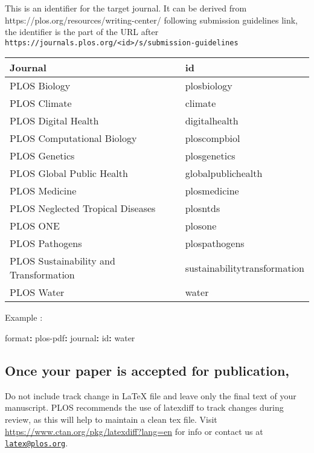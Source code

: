 \documentclass[
  10pt,
  letterpaper,
]{article}
\newenvironment{Shaded}{\begin{snugshade}}{\end{snugshade}}
\newcommand{\AttributeTok}[1]{\textcolor[rgb]{0.40,0.45,0.13}{#1}}
\newcommand{\FunctionTok}[1]{\textcolor[rgb]{0.28,0.35,0.67}{#1}}
\newcommand{\KeywordTok}[1]{\textcolor[rgb]{0.00,0.23,0.31}{\textbf{#1}}}
\begin{document}
This is an identifier for the target journal. It can be derived from
https://plos.org/resources/writing-center/ following submission
guidelines link, the identifier is the part of the URL after
\texttt{https://journals.plos.org/\textless{}id\textgreater{}/s/submission-guidelines}

\begin{longtable}[]{@{}ll@{}}
\toprule\noalign{}
Journal & id \\
\midrule\noalign{}
\endhead
\bottomrule\noalign{}
\endlastfoot
PLOS Biology & plosbiology \\
PLOS Climate & climate \\
PLOS Digital Health & digitalhealth \\
PLOS Computational Biology & ploscompbiol \\
PLOS Genetics & plosgenetics \\
PLOS Global Public Health & globalpublichealth \\
PLOS Medicine & plosmedicine \\
PLOS Neglected Tropical Diseases & plosntds \\
PLOS ONE & plosone \\
PLOS Pathogens & plospathogens \\
PLOS Sustainability and Transformation & sustainabilitytransformation \\
PLOS Water & water \\
\end{longtable}

Example :

\begin{Shaded}
\begin{Highlighting}[]
\FunctionTok{format}\KeywordTok{:}
\AttributeTok{  }\FunctionTok{plos{-}pdf}\KeywordTok{:}
\AttributeTok{    }\FunctionTok{journal}\KeywordTok{:}
\AttributeTok{      }\FunctionTok{id}\KeywordTok{:}\AttributeTok{ water}
\end{Highlighting}
\end{Shaded}

\subsection{Once your paper is accepted for
publication,}\label{once-your-paper-is-accepted-for-publication}

Do not include track change in LaTeX file and leave only the final text
of your manuscript. PLOS recommends the use of latexdiff to track
changes during review, as this will help to maintain a clean tex file.
Visit \url{https://www.ctan.org/pkg/latexdiff?lang=en} for info or
contact us at \href{mailto:latex@plos.org}{\nolinkurl{latex@plos.org}}.
\end{document}
